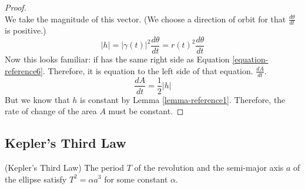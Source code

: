 \documentclass[fleqn,letterpaper]{report}
\begin{document}
\begin{proof}
\begin{equation*}
\end{equation*}
We take the magnitude of this vector. (We choose a direction
of orbit for that $\frac{d\theta}{dt}$ is positive.)
\begin{equation*}
|h| = |\gamma(t)|^2 \frac{d\theta}{dt} = r(t)^2
\frac{d\theta}{dt}
\end{equation*}
Now this looks familiar: if has the same right side as Equation
\ref{equation-reference6}. Therefore, it is equation to the left side
of that equation.
$\frac{dA}{dt}$.
\begin{equation*}
\frac{dA}{dt} = \frac{1}{2} |h|
\end{equation*}
But we know that $h$ is constant by Lemma \ref{lemma-reference1}.
Therefore, the rate of change of the area $A$ must be
constant.
\end{proof} 

\subsection{Kepler's Third Law}
\label{kepler-third}

\begin{prop}
(Kepler's Third Law) The period $T$ of the revolution and the
semi-major axis $a$ of the ellipse satisfy $T^2 = \alpha a^3$
for some constant $\alpha$.
\end{prop}
\end{document}
